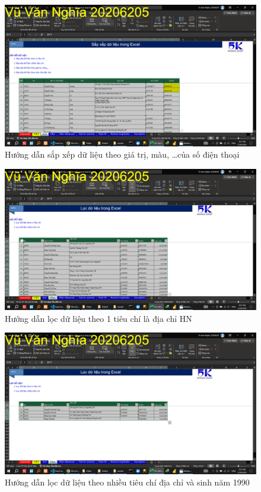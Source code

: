 \documentclass{article}
\begin{document}
\begin{figure}[h]
\centering
\includegraphics[scale = 0.15]{Video1/HuongDan/3.png}
\caption{Hướng dẫn sắp xếp dữ liệu theo giá trị, màu, \dots của số điện thoại}
\end{figure}

\begin{figure}[h]
\centering
\includegraphics[scale = 0.15]{Video1/HuongDan/4.png}
\caption{Hướng dẫn lọc dữ liệu theo 1 tiêu chí là địa chỉ HN}
\end{figure}
\begin{figure}[h]
\centering
\includegraphics[scale = 0.15]{Video1/HuongDan/5.png}
\caption{Hướng dẫn lọc dữ liệu theo nhiều tiêu chí địa chỉ và sinh năm 1990}
\end{figure}
\end{document}
